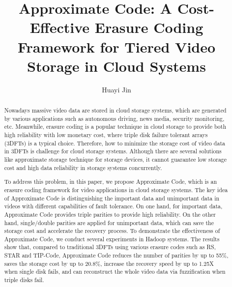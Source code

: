 \documentclass[sigconf]{acmart}
\begin{document}
\title{Approximate Code: A Cost-Effective Erasure Coding Framework for Tiered Video Storage in Cloud Systems}

\author{Huayi Jin}



\begin{abstract}
Nowadays massive video data are stored in cloud storage systems, which are generated by various applications such as autonomous driving, news media, security monitoring, etc. Meanwhile, erasure coding is a popular technique in cloud storage to provide both high reliability with low monetary cost, where triple disk failure tolerant arrays (3DFTs) is a typical choice. Therefore, how to minimize the storage cost of video data in 3DFTs is challenge for cloud storage systems. Although there are several solutions like approximate storage technique for storage devices, it cannot guarantee low storage cost and high data reliability in storage systems concurrently.

To address this problem, in this paper, we propose Approximate Code, which is an erasure coding framework for video applications in cloud storage systems. The key idea of Approximate Code is distinguishing the important data and unimportant data in videos with different capabilities of fault tolerance. On one hand, for important data, Approximate Code provides triple parities to provide high reliability. On the other hand, single/double parities are applied for unimportant data, which can save the storage cost and accelerate the recovery process. To demonstrate the effectiveness of Approximate Code, we conduct several experiments in Hadoop systems. The results show that, compared to traditional 3DFTs using various erasure codes such as RS, STAR and TIP-Code, Approximate Code reduces the number of parities by up to 55\%, saves the storage cost by up to 20.8\%, increase the recovery speed by up to 1.25X when single disk fails, and can reconstruct the whole video data via fuzzification when triple disks fail.
\end{abstract}

%
%
\end{document}
